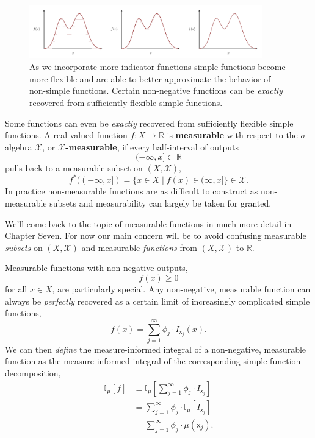 \documentclass[
  letterpaper,
  DIV=11,
  numbers=noendperiod]{scrartcl}
\begin{document}
\begin{figure}

{\centering \includegraphics[width=0.9\textwidth,height=\textheight]{figures/simple_function_approx/simple_function_approx.pdf}

}

\caption{\label{fig-simple-approx}As we incorporate more indicator
functions simple functions become more flexible and are able to better
approximate the behavior of non-simple functions. Certain non-negative
functions can be \emph{exactly} recovered from sufficiently flexible
simple functions.}

\end{figure}

Some functions can even be \emph{exactly} recovered from sufficiently
flexible simple functions. A real-valued function
\(f: X \rightarrow \mathbb{R}\) is \textbf{measurable} with respect to
the \(\sigma\)-algebra \(\mathcal{X}\), or
\textbf{\(\mathcal{X}\)-measurable}, if every half-interval of outputs
\[
(-\infty, x] \subset \mathbb{R}
\] pulls back to a measurable subset on \((X, \mathcal{X})\), \[
f^{*}( (-\infty, x] )
=
\{ x \in X \mid f(x) \in (\infty, x] \}
\in \mathcal{X}.
\] In practice non-measurable functions are as difficult to construct as
non-measurable subsets and measurability can largely be taken for
granted.

We'll come back to the topic of measurable functions in much more detail
in Chapter Seven. For now our main concern will be to avoid confusing
measurable \emph{subsets} on \((X, \mathcal{X})\) and measurable
\emph{functions} from \((X, \mathcal{X})\) to \(\mathbb{R}\).

Measurable functions with non-negative outputs, \[
f(x) \ge 0
\] for all \(x \in X\), are particularly special. Any non-negative,
measurable function can always be \emph{perfectly} recovered as a
certain limit of increasingly complicated simple functions, \[
f(x) = \sum_{j = 1}^{\infty} \phi_{j} \cdot I_{\mathsf{x}_{j}}(x).
\] We can then \emph{define} the measure-informed integral of a
non-negative, measurable function as the measure-informed integral of
the corresponding simple function decomposition, \begin{align*}
\mathbb{I}_{\mu}[f]
&\equiv
\mathbb{I}_{\mu} \left[
\sum_{j = 1}^{\infty} \phi_{j} \cdot I_{\mathsf{x}_{j}} \right]
\\
&=
\sum_{j = 1}^{\infty} \phi_{j} \cdot
\mathbb{I}_{\mu} \left[I_{\mathsf{x}_{j}} \right]
\\
&=
\sum_{j = 1}^{\infty} \phi_{j} \cdot
\mu(\mathsf{x}_{j}).
\end{align*}
\end{document}

